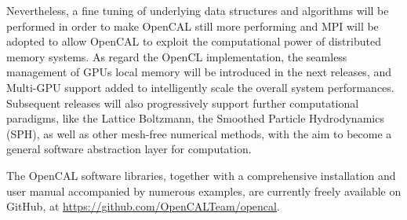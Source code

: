 Nevertheless, a fine tuning of underlying data structures and
algorithms will be performed in order to make OpenCAL still more
performing and MPI will be adopted to allow OpenCAL to exploit the
computational power of distributed memory systems. As regard the
OpenCL implementation, the seamless management of GPUs local memory
will be introduced in the next releases, and Multi-GPU support added
to intelligently scale the overall system performances. Subsequent
releases will also progressively support further computational
paradigms, like the Lattice Boltzmann, the Smoothed Particle
Hydrodynamics (SPH), as well as other mesh-free numerical methods,
with the aim to become a general software abstraction layer for
computation.

The OpenCAL software libraries, together with a comprehensive
installation and user manual accompanied by numerous examples, are
currently freely available on GitHub, at \url{https://github.com/OpenCALTeam/opencal}.

